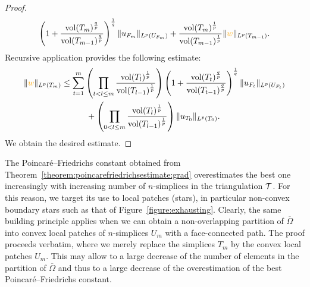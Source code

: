\documentclass[10pt,letterpaper]{article}
\newcommand\cye[1]{%
  \protect\leavevmode
  \begingroup
    \color{red!35!yellow}%
    #1%
  \endgroup
}
\begin{document}
\begin{proof}
\begin{align*}
    \left( 1 + \frac{ \vol(T_m)^{\frac q p} }{ \vol(T_{{m-1}})^{\frac q p} } \right)^{\frac 1 q}
    \| u_{F_m} \|_{L^{p}(U_{F_m})} 
    +
    \frac{ \vol(T_m)^{\frac 1 p} }{ \vol(T_{{m-1}})^{\frac 1 p} }
    \| \cye{w}\|_{L^{p}(T_{{m-1}})}
    .
 \end{align*}
 Recursive application provides the following estimate:
 \begin{align*}
    \| \cye{w} \|_{L^{p}(T_m)}
    &\leq 
    \sum_{t=1}^{m} 
    \left( 
        \prod_{t < l \leq m} 
        \frac{ \vol(T_l)^{\frac 1 p} }{ \vol(T_{l-1})^{\frac 1 p} } 
    \right)
    \left( 1 + \frac{ \vol(T_t)^{\frac q p} }{ \vol(T_{t-1})^{\frac q p} } \right)^{\frac 1 q}
    \| u_{F_t} \|_{L^{p}(U_{F_t})}
    \\&\quad \quad \quad 
    +
    \left( 
        \prod_{0 < l \leq m} 
        \frac{ \vol(T_l)^{\frac 1 p} }{ \vol(T_{l-1})^{\frac 1 p} } 
    \right)
    \| u_{T_0}\|_{L^{p}(T_{0})}
    .
 \end{align*}
 We obtain the desired estimate. 
\end{proof}


\cye{\begin{remark}
The Poincar\'e--Friedrichs constant obtained from Theorem~\ref{theorem:poincarefriedrichsestimate:grad} overestimates the best one increasingly with increasing number of $n$-simplices in the triangulation ${\mathcal T}$. For this reason, we target its use to local patches (stars), in particular non-convex boundary stars such as that of Figure~\ref{figure:exhausting}. Clearly, the same building principle applies when we can obtain a non-overlapping partition of $\overline \Omega$ into convex local patches of $n$-simplices $U_m$ with a  face-connected path. The proof proceeds verbatim, where we merely replace the simplices $T_{m}$ by the convex local patches $U_m$. This may allow to a large decrease of the number of elements in the partition of $\overline \Omega$ and thus to a large decrease of the overestimation of the best Poincar\'e--Friedrichs constant. 
\end{remark}}
\end{document}
